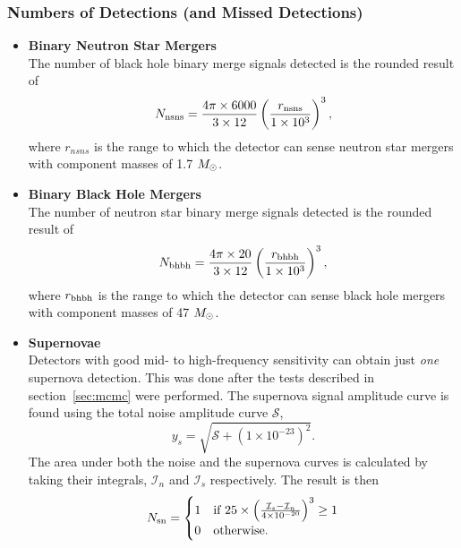 \documentclass{article}
\begin{document}
\subsubsection*{Numbers of Detections (and Missed Detections)}
\begin{itemize}
\item\textbf{Binary Neutron Star Mergers}\\
    The number of black hole binary merge signals detected is the rounded result of
    \begin{equation}
    N_{\rm nsns} = \frac{4\pi\times6000}{3 \times 12}\left(\frac{r_{\rm nsns}}{1 \times 10^3}\right)^3 ,
    \end{equation}
    where $r_{nsns}$ is the range to which the detector can sense
    neutron star mergers with component masses of 1.7 $M_{\rm \odot}$.
\item\textbf{Binary Black Hole Mergers}\\
    The number of neutron star binary merge signals detected is the rounded result of
    \begin{equation}
    N_{\rm bhbh} = \frac{4\pi\times20}{3 \times 12}\left(\frac{r_{\rm bhbh}}{1 \times 10^3}\right)^3 ,
    \end{equation}
    where $r_{\rm bhbh}$ is the range to which the detector can sense
    black hole mergers with component masses of 47 $M_{\rm \odot}$.
\item\textbf{Supernovae}\\
    Detectors with good mid- to high-frequency sensitivity can obtain
    just \textit{one} supernova detection. This was done after the
    tests described in section~\ref{sec:mcmc} were performed. The
    supernova signal amplitude curve is found using the total noise
    amplitude curve $\mathcal{S}$,
    \begin{equation}
    y_s = \sqrt{\mathcal{S} + (1 \times 10^{-23})^2}.
    \end{equation}
    The area under both the noise and the supernova curves is
    calculated by taking their integrals, $\mathcal{I}_n$ and
    $\mathcal{I}_s$ respectively. The result is then
    \begin{equation}
    N_{\rm sn} = \begin{cases}
             1 & \text{if $25 \times \left(\frac{\mathcal{I}_s - \mathcal{I}_n}{4 \times 10^{-20}}\right)^3 \geq 1$} \\
             0 & \text{otherwise}.
             \end{cases}
    \end{equation}

\end{itemize}
\end{document}
